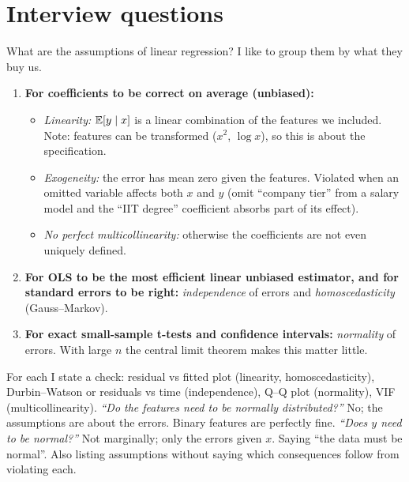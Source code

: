 \section{Interview questions}

\begin{qa}{ What are the assumptions of linear regression?}
\why
I like to group them by what they buy us.
\begin{enumerate}
\item \textbf{For coefficients to be correct on average (unbiased):}
  \begin{itemize}
  \item \emph{Linearity:} $\mathbb{E}[y\mid x]$ is a linear combination of the features we included. Note: features can
    be transformed ($x^2$, $\log x$), so this is about the specification.
  \item \emph{Exogeneity:} the error has mean zero given the features. Violated when an omitted variable affects
    both $x$ and $y$ (omit ``company tier'' from a salary model and the ``IIT degree'' coefficient absorbs part of
    its effect).
  \item \emph{No perfect multicollinearity:} otherwise the coefficients are not even uniquely defined.
  \end{itemize}
\item \textbf{For OLS to be the most efficient linear unbiased estimator, and for standard errors to be right:}
  \emph{independence} of errors and \emph{homoscedasticity} (Gauss--Markov).
\item \textbf{For exact small-sample t-tests and confidence intervals:} \emph{normality} of errors. With large $n$
  the central limit theorem makes this matter little.
\end{enumerate}
\worked For each I state a check: residual vs fitted plot (linearity, homoscedasticity), Durbin--Watson or
residuals vs time (independence), Q--Q plot (normality), VIF (multicollinearity).
\pushes \emph{``Do the features need to be normally distributed?''} No; the assumptions are about the errors.
Binary features are perfectly fine. \emph{``Does $y$ need to be normal?''} Not marginally; only the errors given
$x$.
\pitfall Saying ``the data must be normal''. Also listing assumptions without saying which consequences follow
from violating each.
\end{qa}

